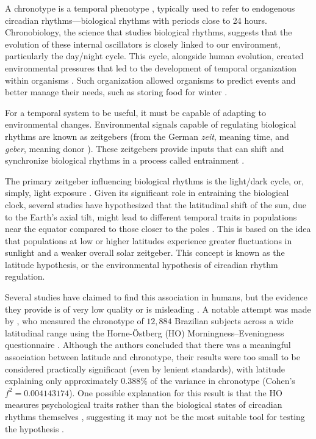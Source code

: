 \documentclass[
12pt,
openright,
oneside,
a4paper,
chapter=TITLE,
section=TITLE,
french,
spanish,
brazil,
english
]{abntex2}
\begin{document}
A chronotype is a temporal phenotype
\autocite{ehret1974a,pittendrigh1993}, typically used to refer to
endogenous circadian rhythms---biological rhythms with periods close to
24 hours. Chronobiology, the science that studies biological rhythms,
suggests that the evolution of these internal oscillators is closely
linked to our environment, particularly the day/night cycle. This cycle,
alongside human evolution, created environmental pressures that led to
the development of temporal organization within organisms
\autocite{pittendrigh1981,aschoff1989,paranjpe2005}. Such organization
allowed organisms to predict events and better manage their needs, such
as storing food for winter \autocite{aschoff1989a}.

For a temporal system to be useful, it must be capable of adapting to
environmental changes. Environmental signals capable of regulating
biological rhythms are known as zeitgebers (from the German \emph{zeit},
meaning time, and \emph{geber}, meaning donor
\autocite{cambridgeuniversitypress}). These zeitgebers provide inputs
that can shift and synchronize biological rhythms in a process called
entrainment \autocite{khalsa2003,minors1991}.

The primary zeitgeber influencing biological rhythms is the light/dark
cycle, or, simply, light exposure
\autocite{aschoff1960,pittendrigh1960,roenneberg2016}. Given its
significant role in entraining the biological clock, several studies
have hypothesized that the latitudinal shift of the sun, due to the
Earth's axial tilt, might lead to different temporal traits in
populations near the equator compared to those closer to the poles
\autocite{bohlen1973,randler2008,leocadio-miguel2014,horzum2015,leocadio-miguel2017}.
This is based on the idea that populations at low or higher latitudes
experience greater fluctuations in sunlight and a weaker overall solar
zeitgeber. This concept is known as the latitude hypothesis, or the
environmental hypothesis of circadian rhythm regulation.

Several studies have claimed to find this association in humans, but the
evidence they provide is of very low quality or is misleading
\autocite{randler2008,leocadio-miguel2014,horzum2015,leocadio-miguel2017,wang2023}.
A notable attempt was made by \textcite{leocadio-miguel2017}, who
measured the chronotype of \(12,884\) Brazilian subjects across a wide
latitudinal range using the Horne-Östberg (HO) Morningness--Eveningness
questionnaire \autocite{horne1976}. Although the authors concluded that
there was a meaningful association between latitude and chronotype,
their results were too small to be considered practically significant
(even by lenient standards), with latitude explaining only approximately
\(0.388\%\) of the variance in chronotype (Cohen's
\(f^2 = 0.004143174\)). One possible explanation for this result is that
the HO measures psychological traits rather than the biological states
of circadian rhythms themselves \autocite{roenneberg2019c}, suggesting
it may not be the most suitable tool for testing the hypothesis
\autocite{leocadio-miguel2014}.
\end{document}
